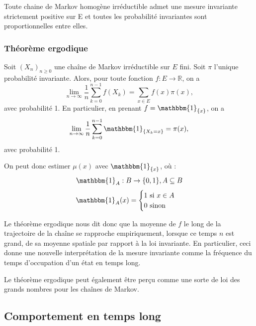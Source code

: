 \documentclass{article}
\begin{document}
\begin{tcolorbox}[colback=white,colframe=blue!80!black,title=Probabilité invariante d'une chaîne de Markov irréductible]
Toute chaine de Markov homogène irréductible admet une mesure invariante strictement positive sur E et toutes les probabilité invariantes sont proportionnelles entre elles.
\end{tcolorbox}

\subsubsection{Théorème ergodique}

\begin{tcolorbox}[colback=white,colframe=red!80!black,title=Théorème ergodique (admis)]

Soit $(X_n)_{n \geq 0}$ une chaîne de Markov irréductible sur $E$ fini. Soit $\pi$ l'unique probabilité invariante. Alors, pour toute fonction $f : E \to \mathbb{R}$, on a
\[
\lim_{n \to \infty} \frac{1}{n} \sum_{k=0}^{n-1} f(X_k) = \sum_{x \in E} f(x)\pi(x),
\]
avec probabilité 1. En particulier, en prenant $f = \mathbbm{1}_{\{x\}}$, on a
\[
\lim_{n \to \infty} \frac{1}{n} \sum_{k=0}^{n-1} \mathbbm{1}_{\{X_k = x\}} = \pi(x),
\]
avec probabilité 1.

\end{tcolorbox}

On peut donc estimer $\mu(x)$ avec $\mathbbm{1}_{\{x\}} $, où :
\[
    \mathbbm{1}_{A} : B \to \{0,1\}, A \subseteq B
\]
\[
    \mathbbm{1}_{A}(x) = \begin{cases}
        1 \text{ si } x \in A \\
        0 \text{ sinon} 
    \end{cases}
\]

Le théorème ergodique nous dit donc que la moyenne de $f$ le long de la trajectoire de la chaîne se rapproche empiriquement,
lorsque ce temps $n$ est grand, de sa moyenne spatiale par rapport à la loi invariante. En particulier, 
ceci donne une nouvelle interprétation de la mesure invariante comme la fréquence du temps d'occupation d'un état en temps long.

Le théorème ergodique peut également être perçu comme une sorte de loi des grands nombres pour les chaînes de Markov.

\newpage %
\subsection{Comportement en temps long}
\end{document}
